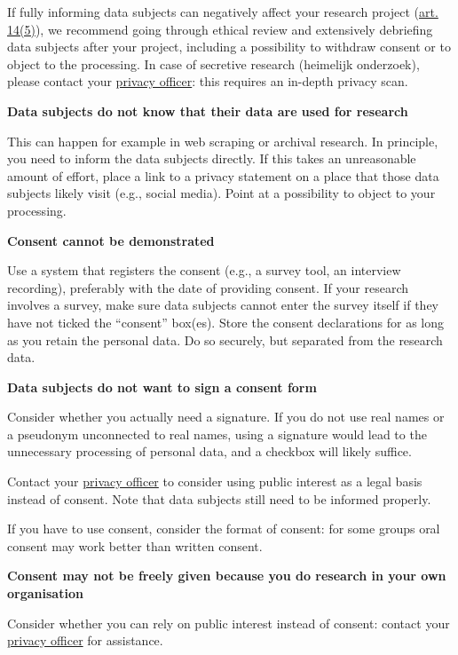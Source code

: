 \documentclass[
]{book}
\begin{document}
If fully informing data subjects can negatively affect your research project (\href{https://gdpr-info.eu/art-14-gdpr/}{art. 14(5)}), we recommend going through ethical review and extensively debriefing data subjects after your project, including a possibility to withdraw consent or to object to the processing. In case of secretive research (heimelijk onderzoek), please contact your \protect\hyperlink{support}{privacy officer}: this requires an in-depth privacy scan.

\textbf{Data subjects do not know that their data are used for research}

This can happen for example in web scraping or archival research. In principle, you need to inform the data subjects directly. If this takes an unreasonable amount of effort, place a link to a privacy statement on a place that those data subjects likely visit (e.g., social media). Point at a possibility to object to your processing.

\textbf{Consent cannot be demonstrated}

Use a system that registers the consent (e.g., a survey tool, an interview recording), preferably with the date of providing consent. If your research involves a survey, make sure data subjects cannot enter the survey itself if they have not ticked the ``consent'' box(es). Store the consent declarations for as long as you retain the personal data. Do so securely, but separated from the research data.

\textbf{Data subjects do not want to sign a consent form}

Consider whether you actually need a signature. If you do not use real names or a pseudonym unconnected to real names, using a signature would lead to the unnecessary processing of personal data, and a checkbox will likely suffice.

Contact your \protect\hyperlink{support}{privacy officer} to consider using public interest as a legal basis instead of consent. Note that data subjects still need to be informed properly.

If you have to use consent, consider the format of consent: for some groups oral consent may work better than written consent.

\textbf{Consent may not be freely given because you do research in your own organisation}

Consider whether you can rely on public interest instead of consent: contact your \protect\hyperlink{support}{privacy officer} for assistance.
\end{document}
